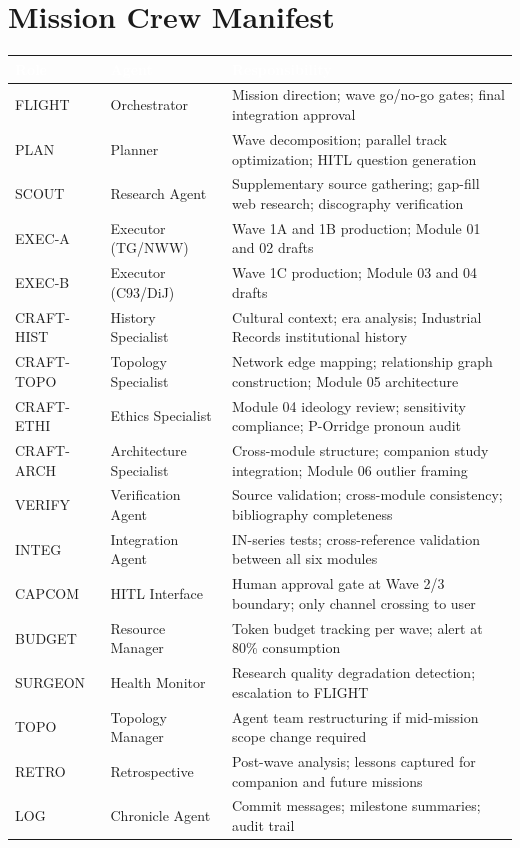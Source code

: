 \documentclass[11pt,letterpaper]{article}
\newcommand{\tableheader}[1]{\textbf{\sffamily\textcolor{white}{#1}}}
\begin{document}
\section{Mission Crew Manifest}

\begin{center}
\begin{tabularx}{\textwidth}{L{2cm}L{3cm}X}
\toprule
{}
\tableheader{Role} & \tableheader{Agent} & \tableheader{Responsibility} \\
\midrule
FLIGHT & Orchestrator & Mission direction; wave go/no-go gates; final integration approval \\
PLAN & Planner & Wave decomposition; parallel track optimization; HITL question generation \\
SCOUT & Research Agent & Supplementary source gathering; gap-fill web research; discography verification \\
EXEC-A & Executor (TG/NWW) & Wave 1A and 1B production; Module 01 and 02 drafts \\
EXEC-B & Executor (C93/DiJ) & Wave 1C production; Module 03 and 04 drafts \\
CRAFT-HIST & History Specialist & Cultural context; era analysis; Industrial Records institutional history \\
CRAFT-TOPO & Topology Specialist & Network edge mapping; relationship graph construction; Module 05 architecture \\
CRAFT-ETHI & Ethics Specialist & Module 04 ideology review; sensitivity compliance; P-Orridge pronoun audit \\
CRAFT-ARCH & Architecture Specialist & Cross-module structure; companion study integration; Module 06 outlier framing \\
VERIFY & Verification Agent & Source validation; cross-module consistency; bibliography completeness \\
INTEG & Integration Agent & IN-series tests; cross-reference validation between all six modules \\
CAPCOM & HITL Interface & Human approval gate at Wave 2/3 boundary; only channel crossing to user \\
BUDGET & Resource Manager & Token budget tracking per wave; alert at 80\% consumption \\
SURGEON & Health Monitor & Research quality degradation detection; escalation to FLIGHT \\
TOPO & Topology Manager & Agent team restructuring if mid-mission scope change required \\
RETRO & Retrospective & Post-wave analysis; lessons captured for companion and future missions \\
LOG & Chronicle Agent & Commit messages; milestone summaries; audit trail \\
\bottomrule
\end{tabularx}
\end{center}
\end{document}
